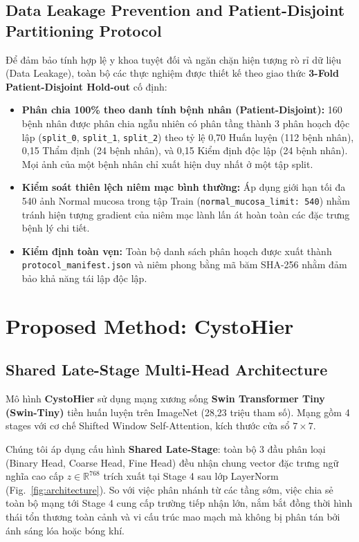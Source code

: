 \documentclass[runningheads]{llncs}
\begin{document}
\subsection{Data Leakage Prevention and Patient-Disjoint Partitioning Protocol}
Để đảm bảo tính hợp lệ y khoa tuyệt đối và ngăn chặn hiện tượng rò rỉ dữ liệu (Data Leakage), toàn bộ các thực nghiệm được thiết kế theo giao thức \textbf{3-Fold Patient-Disjoint Hold-out} cố định:
\begin{itemize}
    \item \textbf{Phân chia 100\% theo danh tính bệnh nhân (Patient-Disjoint):} 160 bệnh nhân được phân chia ngẫu nhiên có phân tầng thành 3 phân hoạch độc lập (\texttt{split\_0}, \texttt{split\_1}, \texttt{split\_2}) theo tỷ lệ 0,70 Huấn luyện (112 bệnh nhân), 0,15 Thẩm định (24 bệnh nhân), và 0,15 Kiểm định độc lập (24 bệnh nhân). Mọi ảnh của một bệnh nhân chỉ xuất hiện duy nhất ở một tập split.
    \item \textbf{Kiểm soát thiên lệch niêm mạc bình thường:} Áp dụng giới hạn tối đa 540 ảnh Normal mucosa trong tập Train (\texttt{normal\_mucosa\_limit: 540}) nhằm tránh hiện tượng gradient của niêm mạc lành lấn át hoàn toàn các đặc trưng bệnh lý chi tiết.
    \item \textbf{Kiểm định toàn vẹn:} Toàn bộ danh sách phân hoạch được xuất thành \texttt{protocol\_manifest.json} và niêm phong bằng mã băm SHA-256 nhằm đảm bảo khả năng tái lập độc lập.
\end{itemize}

\FloatBarrier
\section{Proposed Method: CystoHier}
\label{sec:methodology}

\subsection{Shared Late-Stage Multi-Head Architecture}
Mô hình \textbf{CystoHier} sử dụng mạng xương sống \textbf{Swin Transformer Tiny (Swin-Tiny)} \cite{ref_liu2021swin} tiền huấn luyện trên ImageNet (28,23 triệu tham số). Mạng gồm 4 stages với cơ chế Shifted Window Self-Attention, kích thước cửa sổ $7 \times 7$.

Chúng tôi áp dụng cấu hình \textbf{Shared Late-Stage}: toàn bộ 3 đầu phân loại (Binary Head, Coarse Head, Fine Head) đều nhận chung vector đặc trưng ngữ nghĩa cao cấp $z \in \mathbb{R}^{768}$ trích xuất tại Stage 4 sau lớp LayerNorm (Fig.~\ref{fig:architecture}). So với việc phân nhánh từ các tầng sớm, việc chia sẻ toàn bộ mạng tới Stage 4 cung cấp trường tiếp nhận lớn, nắm bắt đồng thời hình thái tổn thương toàn cảnh và vi cấu trúc mao mạch mà không bị phân tán bởi ánh sáng lóa hoặc bóng khí.
\end{document}
